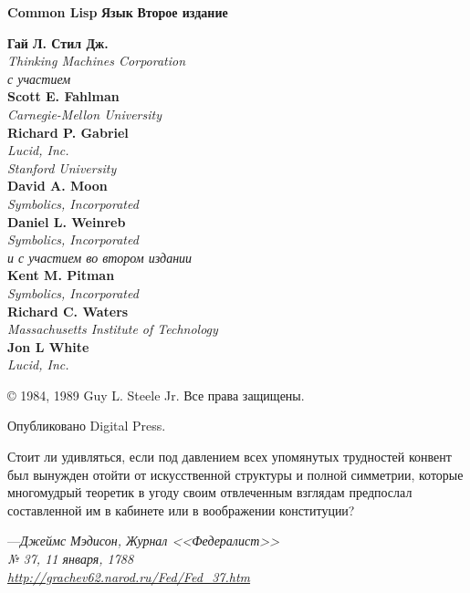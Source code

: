 \else

\begin{titlepage}

\noindent\textbf{Common Lisp}
\noindent\textbf{Язык}
\noindent\textbf{Второе издание}
\begin{flushleft}
\textbf{Гай Л. Стил Дж.} \\
\emph{Thinking Machines Corporation} \\
\emph{с участием} \\
\textbf{Scott E. Fahlman} \\
\emph{Carnegie-Mellon University} \\
\textbf{Richard P. Gabriel} \\
\emph{Lucid, Inc.} \\
\emph{Stanford University} \\
\textbf{David A. Moon} \\
\emph{Symbolics, Incorporated} \\
\textbf{Daniel L. Weinreb} \\
\emph{Symbolics, Incorporated} \\
\emph{и с участием во втором издании} \\
\textbf{Kent M. Pitman} \\
\emph{Symbolics, Incorporated} \\
\textbf{Richard C. Waters} \\
\emph{Massachusetts Institute of Technology} \\
\textbf{Jon L White} \\
\emph{Lucid, Inc.}
\end{flushleft}

\begin{center}
\copyright{} 1984, 1989 Guy L. Steele Jr. Все права защищены.
\end{center}
\begin{flushright}
Опубликовано Digital Press.
\end{flushright}

\end{titlepage}

\newpage 

Стоит ли удивляться, если под давлением всех упомянутых трудностей конвент был
вынужден отойти от искусственной структуры и полной симметрии, которые
многомудрый теоретик в угоду своим отвлеченным взглядам предпослал составленной
им в кабинете или в воображении конституции?
\begin{tabbing}
---\=\emph{Джеймс Мэдисон, Журнал <<Федералист>>} \\
\>\emph{№ 37, 11 января, 1788} \\
\>\emph{\href{http://grachev62.narod.ru/Fed/Fed\_37.htm}{http://grachev62.narod.ru/Fed/Fed\_37.htm}}
\end{tabbing}

\fi